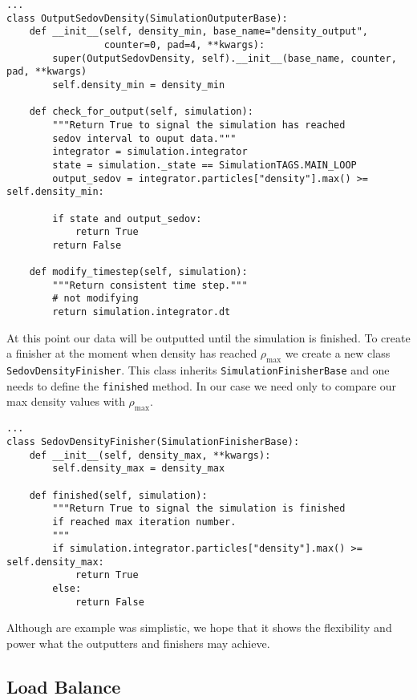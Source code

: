 \begin{lstlisting}
...
class OutputSedovDensity(SimulationOutputerBase):
    def __init__(self, density_min, base_name="density_output",
                 counter=0, pad=4, **kwargs):
        super(OutputSedovDensity, self).__init__(base_name, counter, pad, **kwargs)
        self.density_min = density_min 

    def check_for_output(self, simulation):
        """Return True to signal the simulation has reached
        sedov interval to ouput data."""
        integrator = simulation.integrator
        state = simulation._state == SimulationTAGS.MAIN_LOOP
        output_sedov = integrator.particles["density"].max() >= self.density_min:

        if state and output_sedov:
            return True
        return False

    def modify_timestep(self, simulation):
        """Return consistent time step."""
        # not modifying
        return simulation.integrator.dt

\end{lstlisting}
At this point our data will be outputted until the simulation is finished. To
create a finisher at the moment when density has reached $\rho_{\mathrm{max}}$
we create a new class \lstinline{SedovDensityFinisher}. This class inherits
\lstinline{SimulationFinisherBase} and one needs to define the \lstinline{finished}
method. In our case we need only to compare our max density values with
$\rho_{\mathrm{max}}$.
\begin{lstlisting}
...
class SedovDensityFinisher(SimulationFinisherBase):
    def __init__(self, density_max, **kwargs):
        self.density_max = density_max

    def finished(self, simulation):
        """Return True to signal the simulation is finished
        if reached max iteration number.
        """
        if simulation.integrator.particles["density"].max() >= self.density_max:
            return True
        else:
            return False

\end{lstlisting}

Although are example was simplistic, we hope that it shows the flexibility and power
what the outputters and finishers may achieve.  

\subsection{Load Balance}


